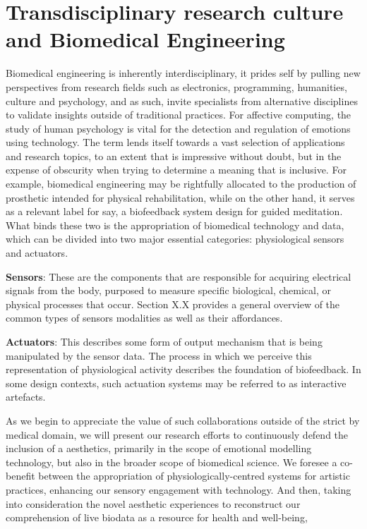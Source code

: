 
\section{Transdisciplinary research culture and Biomedical Engineering}

Biomedical engineering is inherently interdisciplinary, it prides self by pulling new perspectives from research fields such as electronics, programming, humanities, culture and psychology, and as such, invite specialists from alternative disciplines to validate insights outside of traditional practices. For affective computing, the study of human psychology is vital for the detection and regulation of emotions using technology. The term lends itself towards a vast selection of applications and research topics, to an extent that is impressive without doubt, but in the expense of obscurity when trying to determine a meaning that is inclusive. For example, biomedical engineering may be rightfully allocated to the production of prosthetic intended for physical rehabilitation, while on the other hand, it serves as a relevant label for say, a biofeedback system design for guided meditation. What binds these two is the appropriation of biomedical technology and data, which can be divided into two major essential categories: physiological sensors and actuators.

\textbf{Sensors}: These are the components that are responsible for acquiring electrical signals from the body, purposed to measure specific biological, chemical, or physical processes that occur. Section X.X provides a general overview of the common types of sensors modalities as well as their affordances.

\textbf{Actuators}: This describes some form of output mechanism that is being manipulated by the sensor data. The process in which we perceive this representation of physiological activity describes the foundation of biofeedback. In some design contexts, such actuation systems may be referred to as interactive artefacts.

As we begin to appreciate the value of such collaborations outside of the strict by medical domain, we will present our research efforts to continuously defend the inclusion of a aesthetics, primarily in the scope of emotional modelling technology, but also in the broader scope of biomedical science. We foresee a co-benefit between the appropriation of physiologically-centred systems for artistic practices, enhancing our sensory engagement with technology. And then, taking into consideration the novel aesthetic experiences to reconstruct our comprehension of live biodata as a resource for health and well-being,

